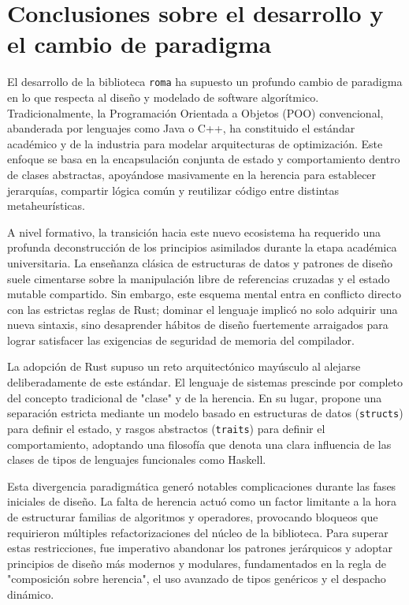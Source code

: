 \documentclass[12pt,a4paper,twoside,openright]{book}
\begin{document}
\section{Conclusiones sobre el desarrollo y el cambio de paradigma}
    El desarrollo de la biblioteca \texttt{roma} ha supuesto un profundo cambio de paradigma en lo que respecta al diseño y modelado de software algorítmico. Tradicionalmente, la Programación Orientada a Objetos (POO) convencional, abanderada por lenguajes como Java o C++, ha constituido el estándar académico y de la industria para modelar arquitecturas de optimización. Este enfoque se basa en la encapsulación conjunta de estado y comportamiento dentro de clases abstractas, apoyándose masivamente en la herencia para establecer jerarquías, compartir lógica común y reutilizar código entre distintas metaheurísticas.

    A nivel formativo, la transición hacia este nuevo ecosistema ha requerido una profunda deconstrucción de los principios asimilados durante la etapa académica universitaria. La enseñanza clásica de estructuras de datos y patrones de diseño suele cimentarse sobre la manipulación libre de referencias cruzadas y el estado mutable compartido. Sin embargo, este esquema mental entra en conflicto directo con las estrictas reglas de Rust; dominar el lenguaje implicó no solo adquirir una nueva sintaxis, sino desaprender hábitos de diseño fuertemente arraigados para lograr satisfacer las exigencias de seguridad de memoria del compilador.

    La adopción de Rust supuso un reto arquitectónico mayúsculo al alejarse deliberadamente de este estándar. El lenguaje de sistemas prescinde por completo del concepto tradicional de "clase" y de la herencia. En su lugar, propone una separación estricta mediante un modelo basado en estructuras de datos (\texttt{structs}) para definir el estado, y rasgos abstractos (\texttt{traits}) para definir el comportamiento, adoptando una filosofía que denota una clara influencia de las clases de tipos de lenguajes funcionales como Haskell.

    Esta divergencia paradigmática generó notables complicaciones durante las fases iniciales de diseño. La falta de herencia actuó como un factor limitante a la hora de estructurar familias de algoritmos y operadores, provocando bloqueos que requirieron múltiples refactorizaciones del núcleo de la biblioteca. Para superar estas restricciones, fue imperativo abandonar los patrones jerárquicos y adoptar principios de diseño más modernos y modulares, fundamentados en la regla de "composición sobre herencia", el uso avanzado de tipos genéricos y el despacho dinámico.
\end{document}
